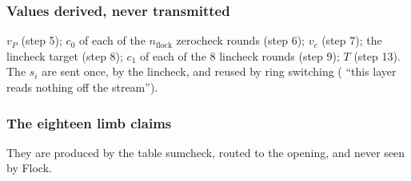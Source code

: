 \subsubsection{Values derived, never transmitted}\label{sec:gen-flock-ring-derived}

$v_P$ (step 5); $c_0$ of each of the $n_{\mathrm{flock}}$ zerocheck rounds (step 6); $v_c$
(step 7); the lincheck target (step 8); $c_1$ of each of the 8 lincheck rounds (step 9); $T$
(step 13). The $s_i$ are sent once, by the lincheck, and reused by ring switching
( \enquote{this layer reads nothing off the stream}).

\subsubsection{The eighteen limb claims}\label{sec:gen-flock-ring-limbs}

They are produced by the table sumcheck, routed to the opening, and never seen by Flock.

